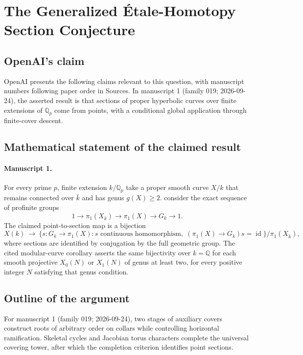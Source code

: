 \documentclass[11pt]{article}
\begin{document}
\section*{The Generalized Étale-Homotopy Section Conjecture}

\subsection{OpenAI's claim}
OpenAI presents the following claims relevant to this question, with manuscript numbers following paper order in Sources. In manuscript 1 (family 019; 2026-09-24), the asserted result is that sections of proper hyperbolic curves over finite extensions of $\mathbb Q_p$ come from points, with a conditional global application through finite-cover descent.

\subsection{Mathematical statement of the claimed result}
\paragraph{Manuscript 1.}
For every prime $p$, finite extension $k/\mathbb Q_p$ take a proper smooth curve $X/k$ that remains connected over $\bar k$ and has genus $g(X)\ge2$. consider the exact sequence of profinite groups
\[
 1\longrightarrow\pi_1(X_{\bar k})\longrightarrow\pi_1(X)
 \longrightarrow G_k\longrightarrow1.
\]
The claimed point-to-section map is a bijection
\[
 X(k)\ \longrightarrow\
 \{s:G_k\to\pi_1(X):s\text{ continuous homomorphism},\;
             (\pi_1(X)\to G_k)s=\operatorname{id}\}/\pi_1(X_{\bar k}),
\]
where sections are identified by conjugation by the full geometric group. The cited modular-curve corollary asserts the same bijectivity over $k=\mathbb Q$ for each smooth projective $X_0(N)$ or $X_1(N)$ of genus at least two, for every positive integer $N$ satisfying that genus condition.

\subsection{Outline of the argument}
For manuscript 1 (family 019; 2026-09-24), two stages of auxiliary covers construct roots of arbitrary order on collars while controlling horizontal ramification. Skeletal cycles and Jacobian torus characters complete the universal covering tower, after which the completion criterion identifies point sections.
\end{document}
